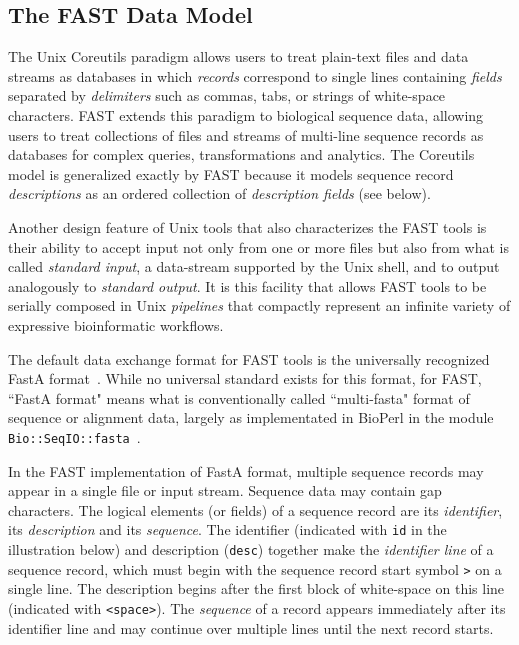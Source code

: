 \documentclass{frontiersSCNS} %
\begin{document}
\subsection{The FAST Data Model}

The Unix Coreutils paradigm allows users to treat plain-text files and
data streams as databases in which {\it records} correspond to single
lines containing {\it fields} separated by {\it delimiters} such as
commas, tabs, or strings of white-space characters.  FAST extends this
paradigm to biological sequence data, allowing users to treat
collections of files and streams of multi-line sequence records as
databases for complex queries, transformations and analytics. The
Coreutils model is generalized exactly by FAST because it models
sequence record {\it descriptions} as an ordered collection of {\it
  description fields} (see below).

Another design feature of Unix tools that also characterizes the FAST
tools is their ability to accept input not only from one or more files
but also from what is called {\it standard input}, a data-stream
supported by the Unix shell, and to output analogously to {\it
  standard output}. It is this facility that allows FAST tools to be
serially composed in Unix {\it pipelines} that compactly represent an
infinite variety of expressive bioinformatic workflows. 

The default data exchange format for FAST tools is the universally
recognized FastA format~\citep{lipman1985rapid}. While no universal
standard exists for this format, for FAST, ``FastA format" means what
is conventionally called ``multi-fasta" format of sequence or alignment
data, largely as implementated in BioPerl in the module {\tt
  Bio::SeqIO::fasta}~\citep{Stajich2002}.

In the FAST implementation of FastA format, multiple sequence records
may appear in a single file or input stream. Sequence data may contain
gap characters. The logical elements (or fields) of a sequence record
are its {\it identifier}, its {\it description} and its {\it
  sequence}. The identifier (indicated with {\tt id} in the
illustration below) and description ({\tt desc}) together make the
{\it identifier line} of a sequence record, which must begin with the
sequence record start symbol {\tt >} on a single line. The description
begins after the first block of white-space on this line (indicated
with {\tt <space>}). The {\it sequence} of a record appears
immediately after its identifier line and may continue over multiple
lines until the next record starts.
\end{document}

